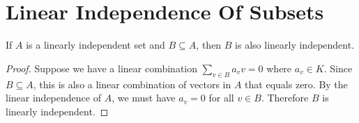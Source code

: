 \section{Linear Independence Of Subsets}

\begin{theorem}
  \label{theorem : subset_linear_independent}
  \leanok
  If $A$ is a linearly independent set and $B \subseteq A$, then $B$ is also linearly independent.
\end{theorem}

\begin{proof}
  Suppose we have a linear combination $\sum_{v \in B} a_v v = 0$ where $a_v \in K$. Since $B \subseteq A$, this is also a linear combination of vectors in $A$ that equals zero. By the linear independence of $A$, we must have $a_v = 0$ for all $v \in B$. Therefore $B$ is linearly independent.
\end{proof}